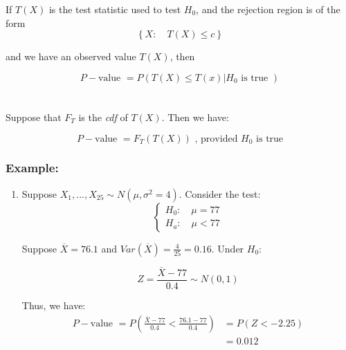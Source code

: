\documentclass{article}
\begin{document}
    If $T(X)$ is the test statistic used to test $H_0$, and the rejection region is of the form
    \begin{equation}
        \left\{X: \quad T(X) \leq c \right\}
    \end{equation}
    
    and we have an observed value $T(X)$, then 
    
    \begin{equation*}
        P-\text{value } = P(T(X) \leq T(x) | H_0 \text{ is true })
    \end{equation*}
    \\~\\
    \noindent Suppose that $F_T$ is the \textit{cdf} of $T(X)$. Then we have:
    
    \begin{equation*}
        P-\text{value } = F_T(T(X)) \text{ , provided $H_0$ is true}
    \end{equation*}

    \subsubsection*{Example:}
    
    \begin{enumerate}
        \item Suppose $X_1,...,X_{25} \sim N(\mu,\sigma^2 = 4)$. Consider the test:
        \begin{equation*}
            \begin{cases}
                H_0: \quad \mu = 77\\
                H_a: \quad \mu < 77
            \end{cases}
        \end{equation*}
        
        Suppose $\overline{X} = 76.1$ and $Var(\overline{X}) = \frac{4}{25} = 0.16$. Under $H_0$:
        
        \begin{equation*}
            Z = \frac{\overline{X}-77}{0.4} \sim N(0,1)
        \end{equation*}
        
        Thus, we have:
        \begin{equation*}
            \begin{split}
                P-\text{value } = P \left(\frac{\overline{X}-77}{0.4} < \frac{76.1-77}{0.4} \right) &= P(Z < -2.25)\\
                        &= 0.012
            \end{split}
        \end{equation*}
        
    \end{enumerate}
\end{document}
